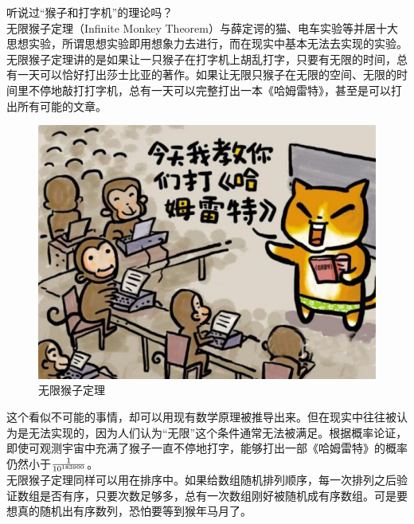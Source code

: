 听说过“猴子和打字机”的理论吗？\\

无限猴子定理（Infinite Monkey Theorem）与薛定谔的猫、电车实验等并居十大思想实验，所谓思想实验即用想象力去进行，而在现实中基本无法去实现的实验。\\

无限猴子定理讲的是如果让一只猴子在打字机上胡乱打字，只要有无限的时间，总有一天可以恰好打出莎士比亚的著作。如果让无限只猴子在无限的空间、无限的时间里不停地敲打打字机，总有一天可以完整打出一本《哈姆雷特》，甚至是可以打出所有可能的文章。

\begin{figure}[H]
	\centering
	\includegraphics[]{img/Chapter8/8-12/1.png}
	\caption{无限猴子定理}
\end{figure}

这个看似不可能的事情，却可以用现有数学原理被推导出来。但在现实中往往被认为是无法实现的，因为人们认为“无限”这个条件通常无法被满足。根据概率论证，即使可观测宇宙中充满了猴子一直不停地打字，能够打出一部《哈姆雷特》的概率仍然小于$ 1 \over 10^{183900} $。\\

无限猴子定理同样可以用在排序中。如果给数组随机排列顺序，每一次排列之后验证数组是否有序，只要次数足够多，总有一次数组刚好被随机成有序数组。可是要想真的随机出有序数列，恐怕要等到猴年马月了。

\newpage